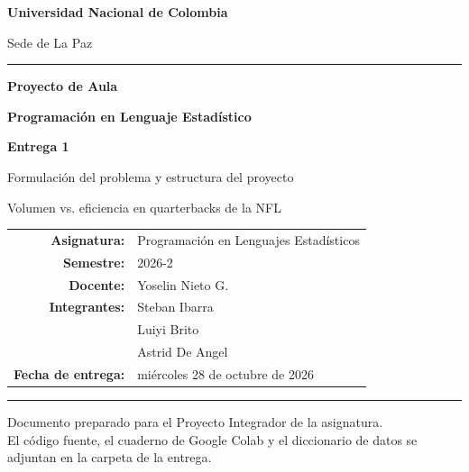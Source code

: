 \documentclass[11pt,a4paper]{article}
\begin{document}
\begin{titlepage}
  \centering
  \vspace*{1.2cm}
  {\Large\bfseries Universidad Nacional de Colombia\par}
  {\large Sede de La Paz\par}
  \vspace{0.4cm}
  {\color{azul}\rule{\textwidth}{1.2pt}\par}
  \vspace{1.4cm}

  {\Huge\bfseries Proyecto de Aula\par}
  \vspace{0.25cm}
  {\Huge\bfseries Programación en Lenguaje Estadístico\par}
  \vspace{1.0cm}
  {\Large\bfseries Entrega 1\par}
  {\Large Formulación del problema y estructura del proyecto\par}
  \vspace{0.7cm}
  {\large Volumen vs. eficiencia en quarterbacks de la NFL\par}

  \vspace{1.6cm}
  \begin{tabular}{rl}
    \textbf{Asignatura:} & Programación en Lenguajes Estadísticos\\
    \textbf{Semestre:} & 2026-2\\
    \textbf{Docente:} & Yoselin Nieto G.\\
    \textbf{Integrantes:} & Steban Ibarra\\
                         & Luiyi Brito\\
                         & Astrid De Angel\\
    \textbf{Fecha de entrega:} & miércoles 28 de octubre de 2026\\
  \end{tabular}

  \vfill
  {\color{azul}\rule{\textwidth}{0.6pt}\par}
  \vspace{0.4cm}
  {\small Documento preparado para el Proyecto Integrador de la asignatura.\\
  El código fuente, el cuaderno de Google Colab y el diccionario de datos se\\
  adjuntan en la carpeta de la entrega.\par}
\end{titlepage}
\end{document}
